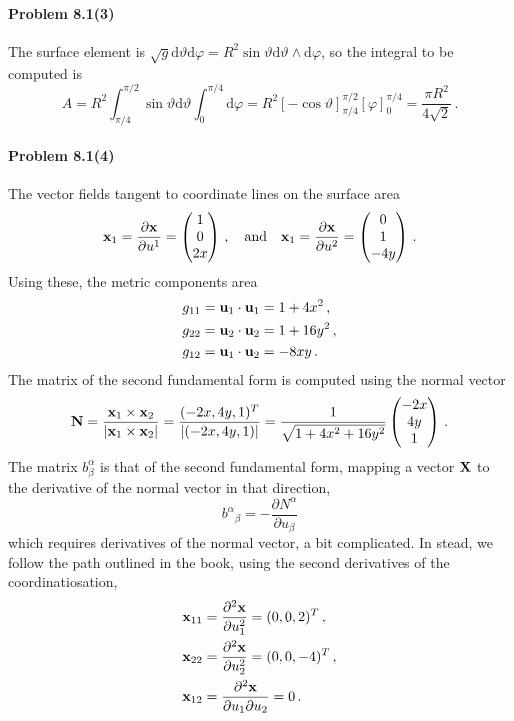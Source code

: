 \documentclass[a4paper,12pt]{article}
\def\d{\mathrm{d}}
\newcommand{\problem}[1]{\paragraph{Problem #1}}
\begin{document}

\problem{8.1(3)} The surface element is $\sqrt{g}\d\vartheta\d\varphi = R^2\sin\vartheta\d\vartheta\wedge\d\varphi$, so the integral to be computed is
\[
 A = R^2\int_{\pi/4}^{\pi/2}\sin\vartheta\d\vartheta\int_0^{\pi/4}\d\varphi=R^2\left[-\cos\vartheta\right]_{\pi/4}^{\pi/2}\left[\varphi\right]_0^{\pi/4} = \frac{\pi R^2}{4\sqrt{2}}\,.
\]


\problem{8.1(4)} The vector fields tangent to coordinate lines on the surface area
\[
{\bf x}_1 = \frac{\partial {\bf x}}{\partial u^1} = \begin{pmatrix} 1\\ 0 \\ 2x\end{pmatrix}\,,\quad\text{and}\quad
{\bf x}_1 = \frac{\partial {\bf x}}{\partial u^2} = \begin{pmatrix} 0\\ 1 \\ -4 y\end{pmatrix}\,.
\]
Using these, the metric components area
\[
 \begin{aligned}
  g_{11} &= {\bf u}_1\cdot {\bf u}_1 = 1+4 x^2\,,\\
  g_{22} &= {\bf u}_2\cdot {\bf u}_2 = 1+16 y^2\,,\\
  g_{12} &= {\bf u}_1\cdot {\bf u}_2 = -8xy\,.\\
 \end{aligned}
\]
The matrix of the second fundamental form is computed using the normal vector
\[
 {\bf N} = \frac{{\bf x}_1\times {\bf x}_2}{|{\bf x}_1\times {\bf x}_2|}=\frac{(-2 x, 4 y, 1)^T}{|(-2 x, 4 y, 1)|} = \frac{1}{\sqrt{1+4x^2+16y^2}}\begin{pmatrix} -2x\\ 4y\\ 1\end{pmatrix}\,.
\]
The matrix $b^{\alpha}_\beta$ is that of the second fundamental form, mapping a vector ${\bf X}$ to the derivative of the normal vector in that direction,
\[
 b^\alpha{}_\beta = -\frac{\partial N^\alpha}{\partial u_\beta}
\]
which requires derivatives of the normal vector, a bit complicated.  In stead, we follow the path outlined in the book, using the second derivatives of the coordinatiosation,
\[
 \begin{aligned}
 {\bf x}_{11} &= \frac{\partial^2{\bf x}}{\partial u_1^2} = (0, 0, 2)^T\,,\\
 {\bf x}_{22} &= \frac{\partial^2{\bf x}}{\partial u_2^2} = (0, 0, -4)^T\,,\\
 {\bf x}_{12} &= \frac{\partial^2{\bf x}}{\partial u_1\partial u_2} = 0\,. 
 \end{aligned}
\]
\end{document}
